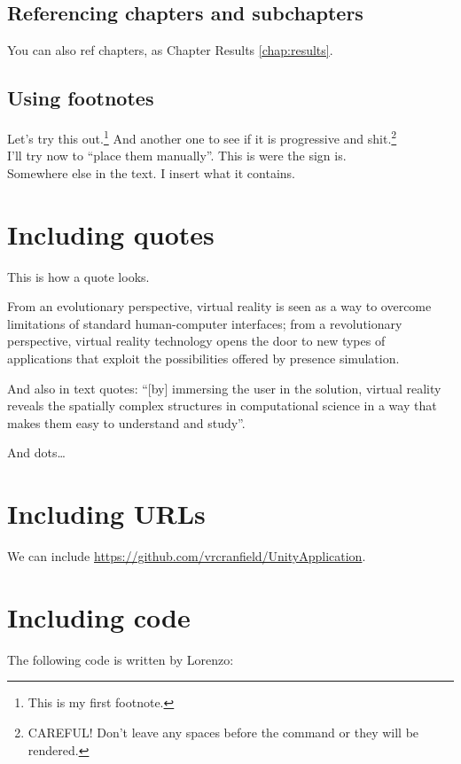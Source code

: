 \subsection{Referencing chapters and subchapters}
You can also ref chapters, as Chapter Results \ref{chap:results}.

\subsection{Using footnotes}
Let's try this out.\footnote{This is my first footnote.} And another one to see if it is progressive and shit.\footnote{CAREFUL! Don't leave any spaces before the command or they will be rendered.}\\

I'll try now to ``place them manually''. This is were the sign is.\footnotemark \\
Somewhere else in the text. I insert what it contains.

\section{Including quotes}
This is how a quote looks. 

\begin{displayquote}
	From an evolutionary perspective, virtual reality is seen as a way to overcome limitations of standard human-computer interfaces; from a revolutionary perspective, virtual reality technology opens the door to new types of applications that exploit the possibilities offered by presence simulation.
\end{displayquote}

And also in text quotes: \enquote{[by] immersing the user in the solution, virtual reality reveals the spatially complex structures in computational science in a way that makes them easy to understand and study}.

And dots\dots

\section{Including URLs}
We can include \url{https://github.com/vrcranfield/UnityApplication}.

\section{Including code}
The following code is written by Lorenzo:


